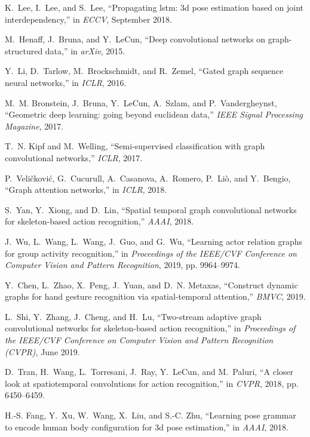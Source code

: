 \documentclass[journal]{IEEEtran}
\begin{document}
\begin{thebibliography}{10}
K.~Lee, I.~Lee, and S.~Lee, ``Propagating lstm: 3d pose estimation based on
  joint interdependency,'' in \emph{ECCV}, September 2018.

M.~Henaff, J.~Bruna, and Y.~LeCun, ``Deep convolutional networks on
  graph-structured data,'' in \emph{arXiv}, 2015.

Y.~Li, D.~Tarlow, M.~Brockschmidt, and R.~Zemel, ``Gated graph sequence neural
  networks,'' in \emph{ICLR}, 2016.

M.~M. Bronstein, J.~Bruna, Y.~LeCun, A.~Szlam, and P.~Vandergheynst,
  ``Geometric deep learning: going beyond euclidean data,'' \emph{IEEE Signal
  Processing Magazine}, 2017.

T.~N. Kipf and M.~Welling, ``Semi-supervised classification with graph
  convolutional networks,'' \emph{ICLR}, 2017.

P.~Veli\v{c}kovi\'{c}, G.~Cucurull, A.~Casanova, A.~Romero, P.~Li\`{o}, and
  Y.~Bengio, ``Graph attention networks,'' in \emph{ICLR}, 2018.

S.~Yan, Y.~Xiong, and D.~Lin, ``Spatial temporal graph convolutional networks
  for skeleton-based action recognition,'' \emph{AAAI}, 2018.

J.~Wu, L.~Wang, L.~Wang, J.~Guo, and G.~Wu, ``Learning actor relation graphs
  for group activity recognition,'' in \emph{Proceedings of the IEEE/CVF
  Conference on Computer Vision and Pattern Recognition}, 2019, pp. 9964--9974.

Y.~Chen, L.~Zhao, X.~Peng, J.~Yuan, and D.~N. Metaxas, ``Construct dynamic
  graphs for hand gesture recognition via spatial-temporal attention,''
  \emph{BMVC}, 2019.

L.~Shi, Y.~Zhang, J.~Cheng, and H.~Lu, ``Two-stream adaptive graph
  convolutional networks for skeleton-based action recognition,'' in
  \emph{Proceedings of the IEEE/CVF Conference on Computer Vision and Pattern
  Recognition (CVPR)}, June 2019.

D.~Tran, H.~Wang, L.~Torresani, J.~Ray, Y.~LeCun, and M.~Paluri, ``A closer
  look at spatiotemporal convolutions for action recognition,'' in \emph{CVPR},
  2018, pp. 6450--6459.

H.-S. Fang, Y.~Xu, W.~Wang, X.~Liu, and S.-C. Zhu, ``Learning pose grammar to
  encode human body configuration for 3d pose estimation,'' in \emph{AAAI},
  2018.


\end{thebibliography}
\end{document}
